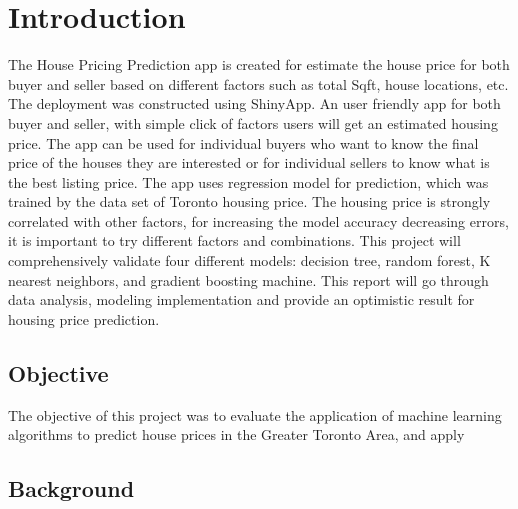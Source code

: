 \documentclass[11pt,]{article}
\begin{document}
\vskip -8.5pt



\noindent  

\hypertarget{introduction}{%
\section{Introduction}\label{introduction}}

The House Pricing Prediction app is created for estimate the house price
for both buyer and seller based on different factors such as total Sqft,
house locations, etc. The deployment was constructed using ShinyApp. An
user friendly app for both buyer and seller, with simple click of
factors users will get an estimated housing price. The app can be used
for individual buyers who want to know the final price of the houses
they are interested or for individual sellers to know what is the best
listing price. The app uses regression model for prediction, which was
trained by the data set of Toronto housing price. The housing price is
strongly correlated with other factors, for increasing the model
accuracy decreasing errors, it is important to try different factors and
combinations. This project will comprehensively validate four different
models: decision tree, random forest, K nearest neighbors, and gradient
boosting machine. This report will go through data analysis, modeling
implementation and provide an optimistic result for housing price
prediction.

\hypertarget{objective}{%
\subsection{Objective}\label{objective}}

The objective of this project was to evaluate the application of machine
learning algorithms to predict house prices in the Greater Toronto Area,
and apply

\hypertarget{background}{%
\subsection{Background}\label{background}}
\end{document}
